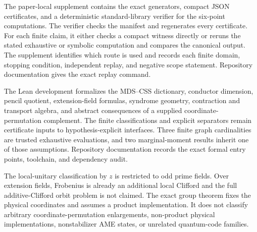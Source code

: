 The paper-local supplement contains the exact generators, compact JSON
certificates, and a deterministic standard-library verifier for the six-point
computations.  The verifier checks the manifest and regenerates every
certificate.  For each finite claim, it either checks a compact witness
directly or reruns the stated exhaustive or symbolic computation and compares
the canonical output.  The supplement identifies which route is used and
records each finite domain, stopping condition, independent replay, and
negative scope statement.  Repository documentation gives the exact replay
command.

The Lean development formalizes the MDS--CSS dictionary, conductor dimension,
pencil quotient, extension-field formulas, syndrome geometry, contraction and
transport algebra, and abstract consequences of a supplied
coordinate-permutation complement.  The finite classifications and explicit
separators remain certificate inputs to hypothesis-explicit interfaces.
Three finite graph cardinalities are trusted exhaustive evaluations, and two
marginal-moment results inherit one of those assumptions.  Repository
documentation records the exact formal entry points, toolchain, and dependency
audit.

The local-unitary classification by \(z\) is restricted to odd prime fields.
Over extension fields, Frobenius is already an additional local Clifford and
the full additive-Clifford orbit problem is not claimed.  The exact group
theorem fixes the physical coordinates and assumes a product implementation.
It does not classify arbitrary coordinate-permutation enlargements,
non-product physical implementations, nonstabilizer AME states, or unrelated
quantum-code families.

